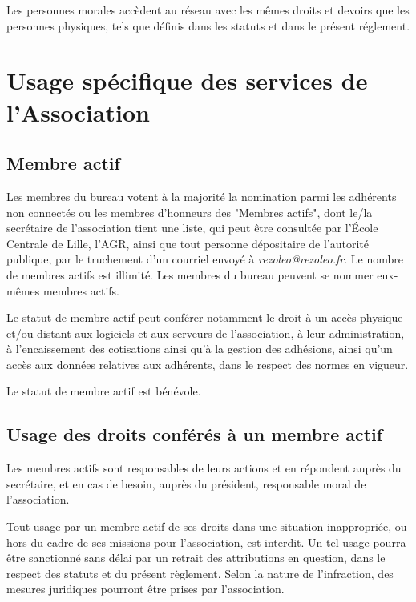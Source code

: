 \documentclass[12pt, a4paper]{article}
\begin{document}
	\bigskip

	Les personnes morales accèdent au réseau avec les mêmes droits et devoirs que
	les personnes physiques, tels que définis dans les statuts et dans le présent réglement.

	\section{Usage spécifique des services de l'Association}

	\subsection{Membre actif}

	Les membres du bureau votent à la majorité la nomination parmi les adhérents non
	connectés ou les membres d'honneurs des "Membres actifs", dont le/la
	secrétaire de l'association tient une liste, qui peut être consultée par l'École
	Centrale de Lille, l'AGR, ainsi que tout personne dépositaire de l'autorité publique,
	par le truchement d'un courriel envoyé à \textit{rezoleo@rezoleo.fr}. Le nombre de membres
	actifs est illimité. Les membres du bureau peuvent se nommer eux-mêmes membres
	actifs.

	\bigskip

	Le statut de membre actif peut conférer notamment le droit à un accès physique
	et/ou distant aux logiciels et aux serveurs de l'association, à leur
	administration, à l'encaissement des cotisations ainsi qu'à la gestion des adhésions,
	ainsi qu'un accès aux données relatives aux adhérents, dans le respect des normes
	en vigueur.

	\bigskip

	Le statut de membre actif est bénévole.

	\subsection{Usage des droits conférés à un membre actif}

	Les membres actifs sont responsables de leurs actions et en répondent auprès du
    secrétaire, et en cas de besoin, auprès du président, responsable
	moral de l'association.

	\bigskip

	Tout usage par un membre actif de ses droits dans une situation inappropriée,
	ou hors du cadre de ses missions pour l'association, est interdit. Un tel
	usage pourra être sanctionné sans délai par un retrait des attributions en
	question, dans le respect des statuts et du présent règlement. Selon la nature
	de l'infraction, des mesures juridiques pourront être prises par l'association.
\end{document}
